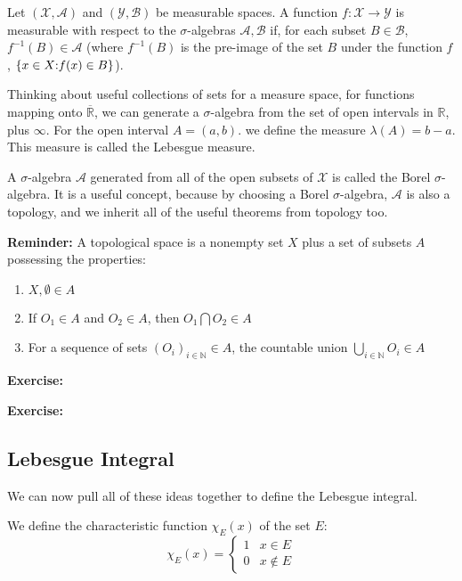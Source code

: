 \documentclass{article}
\begin{document}
Let $\left(\mathcal{X}, \mathcal{A}\right)$ and $\left(\mathcal{Y}, \mathcal{B}\right)$
be measurable spaces. A function $f:\mathcal{X} \rightarrow \mathcal{Y}$ is measurable with 
respect to the $\sigma$-algebras $\mathcal{A}, \mathcal{B}$ if, for each subset
$B \in \mathcal{B}$, $f^{-1}(B) \in \mathcal{A}$ (where $f^{-1}(B)$ is the pre-image of
the set $B$ under the function $f$, $\{x \in X \text: f(x) \in B\}$).

Thinking about useful collections of sets for a measure space, for functions mapping onto 
$\overline{\mathbb{R}}$, we can generate a $\sigma$-algebra from the set of open intervals
in $\mathbb{R}$, plus $\infty$.
For the open interval $A=(a,b)$. we define the measure $\lambda (A) = b-a$. This measure
is called the Lebesgue measure.

A $\sigma$-algebra $\mathcal{A}$ generated from all of the open subsets of $\mathcal{X}$
is called the Borel $\sigma$-algebra. It is a useful concept, because by choosing a Borel
$\sigma$-algebra, $\mathcal{A}$ is also a topology, and we inherit all of the useful
theorems from topology too.

\textbf{Reminder:} A topological space is a nonempty set $X$ plus a set of subsets $A$ possessing
the properties:

\begin{enumerate}
\item $X, \emptyset \in A$
\item If $O_1 \in A$ and $O_2 \in A$, then $O_1 \bigcap O_2 \in A$
\item For a sequence of sets $\left(O_i\right)_{i\in \mathbb{N}} \in A$, the countable
	union $\bigcup_{i\in \mathbb{N}} O_i \in A$
\end{enumerate}

\textbf{Exercise:}

\textbf{Exercise:}

\subsection{Lebesgue Integral}

We can now pull all of these ideas together to define the Lebesgue integral.

We define the characteristic function $\chi_E(x)$ of
the set $E$:
\[ \chi_E(x)=\left\{ 
\begin{array}{ll}
1 & x \in E\\
0 & x \notin E
\end{array} \right.
\]
\end{document}
